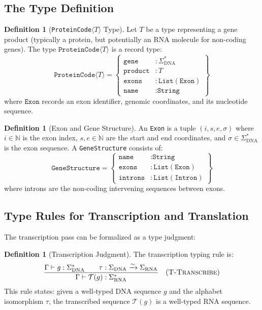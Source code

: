 \documentclass[12pt,a4paper]{article}
\theoremstyle{definition}
\newtheorem{definition}[theorem]{Definition}
\newcommand{\ProteinCode}{\texttt{ProteinCode}\ensuremath{\langle T \rangle}}
\begin{document}
\subsection{The Type Definition}

\begin{definition}[\ProteinCode{} Type]\label{def:proteincode}
Let $T$ be a type representing a gene product (typically a protein, but potentially an RNA molecule for non-coding genes). The type $\texttt{ProteinCode}\langle T \rangle$ is a record type:
\[
  \texttt{ProteinCode}\langle T \rangle = \left\{
  \begin{array}{ll}
    \texttt{gene}    &: \Sigma_\mathrm{DNA}^* \\
    \texttt{product} &: T \\
    \texttt{exons}   &: \texttt{List}(\texttt{Exon}) \\
    \texttt{name}    &: \texttt{String}
  \end{array}
  \right\}
\]
where $\texttt{Exon}$ records an exon identifier, genomic coordinates, and its nucleotide sequence.
\end{definition}

\begin{definition}[Exon and Gene Structure]\label{def:gene-structure}
An \texttt{Exon} is a tuple $(i, s, e, \sigma)$ where $i \in \mathbb{N}$ is the exon index, $s, e \in \mathbb{N}$ are the start and end coordinates, and $\sigma \in \Sigma_\mathrm{DNA}^*$ is the exon sequence. A \texttt{GeneStructure} consists of:
\[
  \texttt{GeneStructure} = \left\{
  \begin{array}{ll}
    \texttt{name}    &: \texttt{String} \\
    \texttt{exons}   &: \texttt{List}(\texttt{Exon}) \\
    \texttt{introns} &: \texttt{List}(\texttt{Intron})
  \end{array}
  \right\}
\]
where introns are the non-coding intervening sequences between exons.
\end{definition}

\subsection{Type Rules for Transcription and Translation}

The transcription pass can be formalized as a type judgment:

\begin{definition}[Transcription Judgment]\label{def:transcription-judgment}
The transcription typing rule is:
\[
  \frac{\Gamma \vdash g : \Sigma_\mathrm{DNA}^* \qquad \tau : \Sigma_\mathrm{DNA} \xrightarrow{\sim} \Sigma_\mathrm{RNA}}
       {\Gamma \vdash \mathcal{T}(g) : \Sigma_\mathrm{RNA}^*}
  \quad (\textsc{T-Transcribe})
\]
This rule states: given a well-typed DNA sequence $g$ and the alphabet isomorphism $\tau$, the transcribed sequence $\mathcal{T}(g)$ is a well-typed RNA sequence.
\end{definition}
\end{document}
